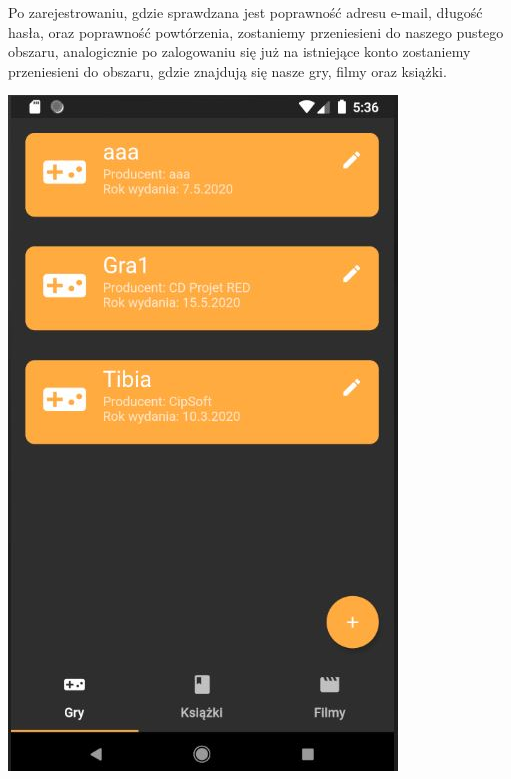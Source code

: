 \documentclass[12pt,a4paper]{article}
\begin{document}
    Po zarejestrowaniu, gdzie sprawdzana jest poprawność adresu e-mail, długość hasła, oraz poprawność powtórzenia, zostaniemy przeniesieni do naszego pustego obszaru, analogicznie po zalogowaniu się już na istniejące konto zostaniemy przeniesieni do obszaru, gdzie znajdują się nasze gry, filmy oraz książki. \\
    \begin{center}
        \includegraphics[scale=0.70]{3.JPG}

\end{center}
\end{document}
